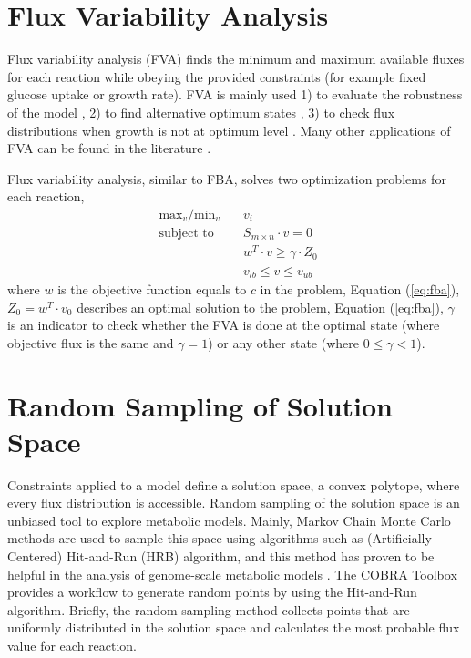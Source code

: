 \section{Flux Variability Analysis}
Flux variability analysis (FVA) finds the minimum and maximum available fluxes for each reaction while obeying the provided constraints (for example fixed glucose uptake or growth rate). FVA is mainly used  1) to evaluate the robustness of the model \cite{thiele2010functional}, 2) to find alternative optimum states \cite{mahadevan2003effects}, 3) to check flux distributions when growth is not at optimum level \cite{reed2004genome}. Many other applications of FVA can be found in the literature \cite{gudmundsson2010computationally}.

Flux variability analysis, similar to FBA, solves two optimization problems for each reaction,
\begin{align}
\ \text{max}_v / \text{min}_v \quad & v_i \\
\ \text{subject to} \quad & S_{m \times n} \cdot v=0 \\
\ & w^T \cdot v \geq \gamma \cdot Z_0 \\
\ & v_{lb} \leq v \leq v_{ub}
\end{align}
\noindent where $w$ is the objective function equals to $c$ in the problem, Equation (\ref{eq:fba}), $Z_0 = w^T \cdot v_0$ describes an optimal solution to the problem, Equation (\ref{eq:fba}), $\gamma$ is an indicator to check whether the FVA is done at the optimal state (where objective flux is the same and $\gamma = 1$) or any other state (where $0 \leq \gamma < 1$).


\section{Random Sampling of Solution Space}
Constraints applied to a model define a solution space, a convex polytope, where every flux distribution is accessible. Random sampling of the solution space is an unbiased tool to explore metabolic models. Mainly, Markov Chain Monte Carlo methods are used to sample this space using algorithms such as (Artificially Centered) Hit-and-Run (HRB) \cite{kiatsupaibul2011analysis, saa2016ll} algorithm, and this method has proven to be helpful in the analysis of genome-scale metabolic models \cite{schellenberger2009use}. The COBRA Toolbox \cite{heirendt2019creation} provides a workflow to generate random points by using the Hit-and-Run algorithm. Briefly, the random sampling method collects points that are uniformly distributed in the solution space and calculates the most probable flux value for each reaction.

